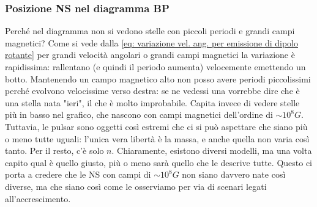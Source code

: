 \subsubsection{Posizione NS nel diagramma BP}
Perché nel diagramma non si vedono stelle con piccoli periodi e grandi campi magnetici?
Come si vede dalla \eqref{eq: variazione vel. ang. per emissione di dipolo rotante} per grandi velocità angolari  o grandi campi magnetici la variazione è rapidissima: rallentano (e quindi il periodo aumenta) velocemente emettendo un botto.
Mantenendo un campo magnetico alto non posso avere periodi piccolissimi perché evolvono velocissime verso destra: se ne vedessi una vorrebbe dire che è una stella nata "ieri", il che è molto improbabile.
Capita invece di vedere stelle più in basso nel grafico, che nascono con campi magnetici dell'ordine di $\sim 10^8G$.
Tuttavia, le pulsar sono oggetti così estremi che ci si può aspettare che siano più o meno tutte uguali: l'unica vera libertà è la massa, e anche quella non varia così tanto.
Per il resto, c'è solo $n$.
Chiaramente, esistono diversi modelli, ma una volta capito qual è quello giusto, più o meno sarà quello che le descrive tutte.
Questo ci porta a credere che le NS con campi di $\sim10^8G$ non siano davvero nate così diverse, ma che siano così come le osserviamo per via di scenari legati all'accrescimento.

